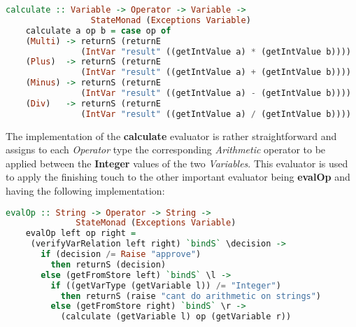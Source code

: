 \documentclass[a4paper, onecolumn]{article}
\begin{document}
    \begin{tcolorbox}
    \begin{lstlisting}[language=Haskell] 
    calculate :: Variable -> Operator -> Variable -> 
                 StateMonad (Exceptions Variable)
    calculate a op b = case op of 
    (Multi) -> returnS (returnE 
               (IntVar "result" ((getIntValue a) * (getIntValue b))))
    (Plus)  -> returnS (returnE 
               (IntVar "result" ((getIntValue a) + (getIntValue b))))
    (Minus) -> returnS (returnE 
               (IntVar "result" ((getIntValue a) - (getIntValue b))))
    (Div)   -> returnS (returnE 
               (IntVar "result" ((getIntValue a) / (getIntValue b))))
    \end{lstlisting}
    \end{tcolorbox}
    
    \noindent The implementation of the \textbf{calculate} evaluator is rather straightforward and assigns to each \textit{Operator} type the corresponding \textit{Arithmetic} operator to be applied between the \textbf{Integer} values of the two \textit{Variables}. This evaluator is used to apply the finishing touch to the other important evaluator being \textbf{evalOp} and having the following implementation:
    
    \begin{tcolorbox}
    \begin{lstlisting}[language=Haskell] 
    evalOp :: String -> Operator -> String ->
              StateMonad (Exceptions Variable)
    evalOp left op right =
     (verifyVarRelation left right) `bindS` \decision ->
       if (decision /= Raise "approve") 
         then returnS (decision) 
       else (getFromStore left) `bindS` \l -> 
         if ((getVarType (getVariable l)) /= "Integer") 
           then returnS (raise "cant do arithmetic on strings") 
         else (getFromStore right) `bindS` \r -> 
           (calculate (getVariable l) op (getVariable r))
    
    \end{lstlisting}
    \end{tcolorbox}
    
\end{document}
